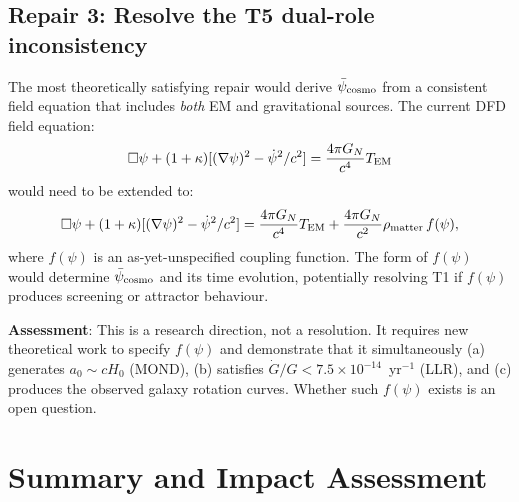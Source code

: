 \documentclass[11pt]{article}
\newcommand{\ee}[1]{\times 10^{#1}}
\newcommand{\psicosmo}{\bar{\psi}_{\rm cosmo}}
\newcommand{\Hzero}{H_0}
\begin{document}
\subsection{Repair 3: Resolve the T5 dual-role inconsistency}

The most theoretically satisfying repair would derive $\psicosmo$ from a
consistent field equation that includes \emph{both} EM and gravitational
sources. The current DFD field equation:
\begin{equation}
\Box\psi + (1+\kappa)[(\nabla\psi)^2 - \dot{\psi}^2/c^2]
= \frac{4\pi G_N}{c^4}T_{\rm EM}
\label{eq:field-eq-current}
\end{equation}
would need to be extended to:
\begin{equation}
\Box\psi + (1+\kappa)[(\nabla\psi)^2 - \dot{\psi}^2/c^2]
= \frac{4\pi G_N}{c^4}T_{\rm EM} + \frac{4\pi G_N}{c^2}\rho_{\rm matter}\,f(\psi),
\label{eq:field-eq-extended}
\end{equation}
where $f(\psi)$ is an as-yet-unspecified coupling function. The form of
$f(\psi)$ would determine $\psicosmo$ and its time evolution, potentially
resolving T1 if $f(\psi)$ produces screening or attractor behaviour.

\textbf{Assessment}: This is a research direction, not a resolution. It
requires new theoretical work to specify $f(\psi)$ and demonstrate that it
simultaneously (a) generates $a_0 \sim c\Hzero$ (MOND), (b) satisfies
$\dot{G}/G < 7.5\ee{-14}$~yr$^{-1}$ (LLR), and (c) produces the observed
galaxy rotation curves. Whether such $f(\psi)$ exists is an open question.

\section{Summary and Impact Assessment}
\label{sec:P5-summary}
\end{document}
